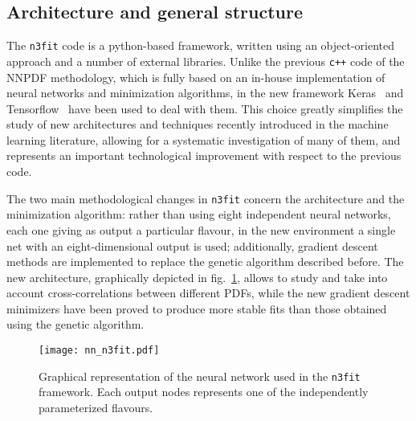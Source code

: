 \subsection{Architecture and general structure}
The {\tt n3fit} code is a python-based framework, written using an object-oriented approach and
a number of external libraries. 
Unlike the previous {\tt c++} code of the NNPDF methodology, 
which is fully based on an in-house implementation of neural networks and minimization algorithms,
in the new framework Keras~\cite{chollet2015keras} and Tensorflow~\cite{tensorflow2015-whitepaper} have been used to deal with them.
This choice greatly simplifies the study of new architectures and techniques recently introduced
in the machine learning literature, allowing for a systematic investigation of many of them, 
and represents an important technological improvement with respect 
to the previous code. 

%
The two main methodological changes in {\tt n3fit} concern the architecture and the minimization algorithm:
rather than using eight independent neural networks, each one giving as output a particular flavour, in
the new environment a single net with an eight-dimensional output is used; additionally, gradient descent
methods are implemented to replace the genetic algorithm described before.
The new architecture, graphically depicted in fig.~\ref{fig:nn_n3fit}, allows to study and take into account 
cross-correlations between different PDFs,
while the new gradient descent minimizers have been proved to produce more stable fits than those 
obtained using the genetic algorithm. 

\begin{figure}[htb]     
	\begin{center}
		\texttt{[image: nn\_n3fit.pdf]}
	\end{center}
    \caption{Graphical representation of the neural network used in the {\tt n3fit} framework.
    Each output nodes represents one of the independently parameterized flavours.}
	\label{fig:nn_n3fit}                 
\end{figure}

